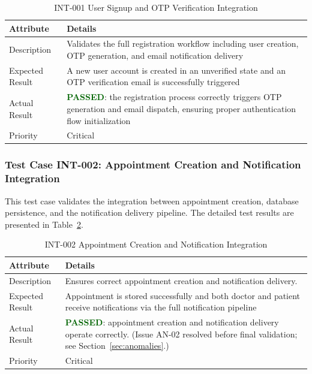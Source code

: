 \begin{table}[H]
\centering
\caption{INT-001 User Signup and OTP Verification Integration}
\label{tab:int001}
\renewcommand{\arraystretch}{1.3}

\begin{tabular}{|p{2cm}|p{13cm}|}
\hline
\rowcolor{blue!10}
\textbf{Attribute} & \textbf{Details} \\
\hline
Description & Validates the full registration workflow including user creation, OTP generation, and email notification delivery \\
\hline
Expected Result & A new user account is created in an unverified state and an OTP verification email is successfully triggered \\
\hline
Actual Result & \textbf{\textcolor{darkgreen}{PASSED}}: the registration process correctly triggers OTP generation and email dispatch, ensuring proper authentication flow initialization \\
\hline
Priority & Critical \\
\hline
\end{tabular}
\end{table}

\subsubsection{Test Case INT-002: Appointment Creation and Notification Integration}

This test case validates the integration between appointment creation, database persistence, and the notification delivery pipeline. The detailed test results are presented in Table~\ref{tab:int002}.

\begin{table}[H]
\centering
\caption{INT-002 Appointment Creation and Notification Integration}
\label{tab:int002}
\renewcommand{\arraystretch}{1.3}

\begin{tabular}{|p{2cm}|p{13cm}|}
\hline
\rowcolor{blue!10}
\textbf{Attribute} & \textbf{Details} \\
\hline
Description & Ensures correct appointment creation and notification delivery.\\
\hline
Expected Result & Appointment is stored successfully and both doctor and patient receive notifications via the full notification pipeline \\
\hline
Actual Result & \textbf{\textcolor{darkgreen}{PASSED}}: appointment creation and notification delivery operate correctly. (Issue AN-02 resolved before final validation; see Section~\ref{sec:anomalies}.) \\
\hline
Priority & Critical \\
\hline
\end{tabular}
\end{table}

